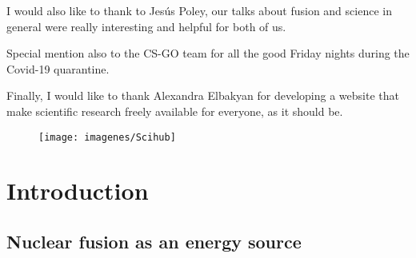 \documentclass[a4paper,12pt,oneside]{book}
\begin{document}
I would also like to thank to Jesús Poley, our talks about fusion and science in general were really interesting and helpful for both of us.

Special mention also to the CS-GO team for all the good Friday nights during the Covid-19 quarantine.


Finally, I would like to thank Alexandra Elbakyan for developing a website that make scientific research freely available for everyone, as it should be.

\begin{figure}[b]
\centering
\texttt{[image: imagenes/Scihub]}
\end{figure}



\tableofcontents %
\cleardoublepage %







\chapter{Introduction}


\section[Nuclear fusion]{Nuclear fusion as an energy source}

%
\end{document}
